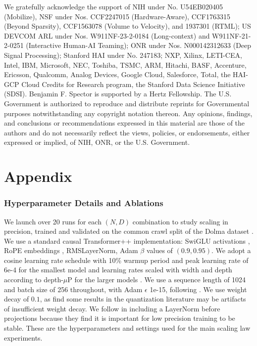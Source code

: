 \documentclass[11pt]{article}
\begin{document}
We gratefully acknowledge the support of NIH under No. U54EB020405 (Mobilize), NSF under Nos. CCF2247015 (Hardware-Aware), CCF1763315 (Beyond Sparsity), CCF1563078 (Volume to Velocity), and 1937301 (RTML); US DEVCOM ARL under Nos. W911NF-23-2-0184 (Long-context) and W911NF-21-2-0251 (Interactive Human-AI Teaming); ONR under Nos. N000142312633 (Deep Signal Processing); Stanford HAI under No. 247183; NXP, Xilinx, LETI-CEA, Intel, IBM, Microsoft, NEC, Toshiba, TSMC, ARM, Hitachi, BASF, Accenture, Ericsson, Qualcomm, Analog Devices, Google Cloud, Salesforce, Total, the HAI-GCP Cloud Credits for Research program, the Stanford Data Science Initiative (SDSI). Benjamin F. Spector is supported by a Hertz Fellowship. The U.S. Government is authorized to reproduce and distribute reprints for Governmental purposes notwithstanding any copyright notation thereon. Any opinions, findings, and conclusions or recommendations expressed in this material are those of the authors and do not necessarily reflect the views, policies, or endorsements, either expressed or implied, of NIH, ONR, or the U.S. Government.




\appendix
\newpage 
\part*{Appendix} %

\section{Hyperparameter Details and Ablations}
\label{appdx: hypers}
 We launch over 20 runs for each $(N, D)$ combination to study scaling in precision, trained and validated on the common crawl split of the Dolma dataset \citep{soldaini2024dolma}. We use a standard causal Transformer++ implementation: SwiGLU activations \citep{shazeer2020glu}, RoPE embeddings \citep{su2021roformer}, RMSLayerNorm, Adam $\beta$ values of $(0.9, 0.95)$. We adopt a cosine learning rate schedule with 10\% warmup period and peak learning rate of 6e-4 for the smallest model and learning rates scaled with width and depth according to depth-$\mu$P for the larger models \citep{yang2022tensor, bordelon2023depthwise}. We use a sequence length of 1024 and batch size of 256 throughout, with Adam $\epsilon$ 1e-15, following \citep{wortsman2023small}. We use weight decay of $0.1$, as \citep{ahmadian2023intriguing} find some results in the quantization literature may be artifacts of insufficient weight decay. We follow \citep{ma2024era} in including a LayerNorm before projections because they find it is important for low precision training to be stable. These are the hyperparameters and settings used for the main scaling law experiments. 
\end{document}
